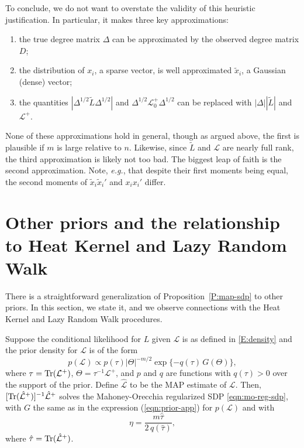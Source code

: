 To conclude, we do not want to overstate the validity of this heuristic 
justification.
In particular, it makes three key approximations:
\begin{enumerate}
\item the true degree matrix $\Delta$ can be
  approximated by the observed degree matrix $D$;
\item the distribution of $x_i$, a sparse vector, is well approximated
  $\tilde x_i$, a Gaussian (dense) vector;
\item the quantities
  $| \Delta^{1/2} \tilde L \Delta^{1/2}|$
  and
  $\Delta^{1/2} \mathcal{L}_0^+ \Delta^{1/2}$
  can be replaced with
  $|\Delta| |\tilde L|$
  and $\mathcal{L}^+$.
\end{enumerate}
None of these approximations hold in general, though as argued above, the 
first is plausible if $m$ is large relative to $n$.  
Likewise, since $\tilde L$ and $\mathcal{L}$ are nearly full rank, the third
approximation is likely not too bad.  
The biggest leap of faith is the second approximation.  
Note, \emph{e.g.}, that despite their first moments being equal, the 
second moments of $\tilde x_i \tilde x_i'$ and $x_i x_i'$ differ.


\vspace{-2mm}
\section{Other priors and the relationship to Heat Kernel and Lazy Random Walk}
\label{sxn:other-priors}
\vspace{-2mm}


There is a straightforward generalization of Proposition~\ref{P:map-sdp} to 
other priors.
In this section, we state it, and we observe connections with the Heat 
Kernel and Lazy Random Walk procedures.

\begin{proposition}
\label{prop:map-generaliz}
  Suppose the conditional likelihood for $L$ given $\mathcal{L}$ is as
  defined in \eqref{E:density} and the prior density for $\mathcal{L}$
  is of the form
  \begin{equation}
    p(\mathcal{L})
      \propto
        p(\tau)
        |\Theta|^{-m/2}
        \exp\{ -q(\tau) \, G(\Theta) \},
  \label{eqn:prior-app}
  \end{equation}
  where
  $\tau = \operatorname*{Tr}(\mathcal{L}^{+})$,
  $\Theta = \tau^{-1} \mathcal{L}^{+}$,
  and $p$ and $q$ are functions with $q(\tau) > 0$ over the support
  of the prior.
  Define
  $\mathcal{\hat L}$ to be the MAP estimate of $\mathcal{L}$.  Then,
  $[\operatorname*{Tr}(\mathcal{\hat L}^+)]^{-1} \mathcal{\hat L}^+$ solves the
  Mahoney-Orecchia regularized SDP \eqref{eqn:mo-reg-sdp}, with $G$ the same 
  as in the expression (\ref{eqn:prior-app}) for $p(\mathcal{L})$ and with
  \[
    \eta = \frac{m \hat \tau}{2 \, q(\hat \tau)},
  \]
  where $\hat \tau = \operatorname*{Tr}(\mathcal{\hat L}^+)$.
\end{proposition}

